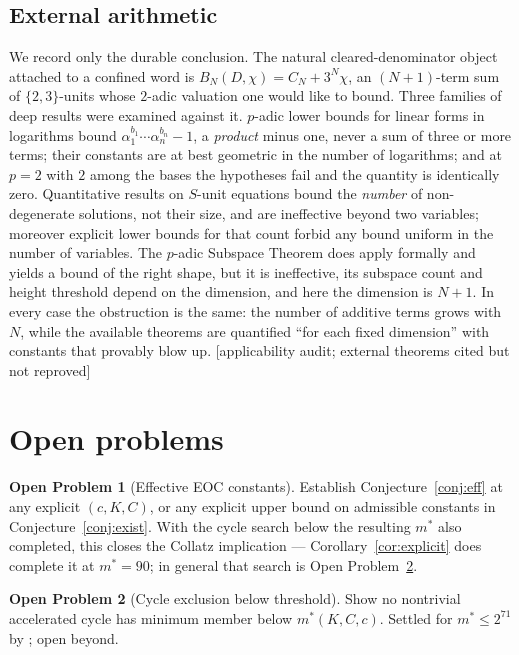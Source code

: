 \documentclass[11pt]{article}
\theoremstyle{plain}
\theoremstyle{definition}
\newtheorem{openproblem}{Open Problem}
\theoremstyle{remark}
\newcommand{\status}[1]{\textsf{\footnotesize[#1]}}
\begin{document}
\subsection{External arithmetic}\label{sec:external}

We record only the durable conclusion. The natural cleared-denominator object attached to a
confined word is $B_N(D,\chi)=C_N+3^N\chi$, an $(N{+}1)$-term sum of $\{2,3\}$-units whose
$2$-adic valuation one would like to bound. Three families of deep results were examined against
it. $p$-adic lower bounds for linear forms in logarithms bound $\alpha_1^{b_1}\cdots\alpha_n^{b_n}-1$,
a \emph{product} minus one, never a sum of three or more terms; their constants are at best
geometric in the number of logarithms; and at $p=2$ with $2$ among the bases the hypotheses fail
and the quantity is identically zero. Quantitative results on $S$-unit equations bound the
\emph{number} of non-degenerate solutions, not their size, and are ineffective beyond two
variables; moreover explicit lower bounds for that count forbid any bound uniform in the number of
variables. The $p$-adic Subspace Theorem does apply formally and yields a bound of the right shape,
but it is ineffective, its subspace count and height threshold depend on the dimension, and here
the dimension is $N{+}1$. In every case the obstruction is the same: the number of additive terms
grows with $N$, while the available theorems are quantified ``for each fixed dimension'' with
constants that provably blow up. \status{applicability audit; external theorems cited but not
reproved}

\section{Open problems}\label{sec:open}

\begin{openproblem}[Effective EOC constants]\label{op:A}
Establish Conjecture~\ref{conj:eff} at any explicit $(c,K,C)$, or any explicit upper bound on
admissible constants in Conjecture~\ref{conj:exist}. With the cycle search below the resulting
$m^*$ also completed, this closes the Collatz implication --- Corollary~\ref{cor:explicit} does
complete it at $m^*=90$; in general that search is Open Problem~\ref{op:B}.
\end{openproblem}

\begin{openproblem}[Cycle exclusion below threshold]\label{op:B}
Show no nontrivial accelerated cycle has minimum member below $m^*(K,C,c)$. Settled for
$m^*\le2^{71}$ by \cite{Barina2025}; open beyond.
\end{openproblem}
\end{document}
